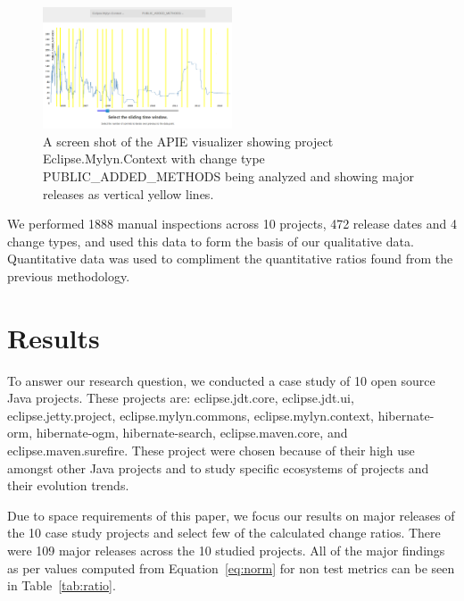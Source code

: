 \documentclass[conference]{IEEEtran}
\begin{document}
\begin{figure}[tb!]
\centering
\includegraphics[width=0.5\textwidth]{images/apie.png}
\caption{A screen shot of the APIE visualizer showing project Eclipse.Mylyn.Context with change type PUBLIC\_ADDED\_METHODS being analyzed and showing
major releases as vertical yellow lines.\label{fig:apie}}
\end{figure}

We performed 1888 manual inspections across 10 projects, 472 release dates and 4 change types, and used this data to form the basis of our qualitative data.
Quantitative data was used to compliment the quantitative ratios found from the previous methodology. 

\section{Results}
\label{sec:results}

To answer our research question, we conducted a case study of 10 open source Java projects. These projects are: eclipse.jdt.core, eclipse.jdt.ui, eclipse.jetty.project, 
eclipse.mylyn.commons, eclipse.mylyn.context, hibernate-orm, hibernate-ogm, hibernate-search, eclipse.maven.core, and eclipse.maven.surefire. These project were chosen
because of their high use amongst other Java projects and to study specific ecosystems of projects and their evolution trends.

Due to space requirements of this paper, we focus our results on major releases of the 10 case study projects and select few of the calculated change ratios. 
There were 109 major releases across the 10 studied projects. All of the major findings as per values computed from Equation~\ref{eq:norm} for non test metrics
can be seen in Table~\ref{tab:ratio}.
\end{document}
